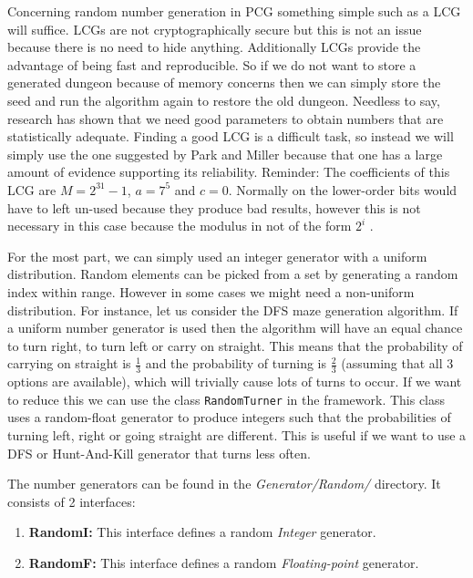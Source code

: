 Concerning random number generation in PCG something simple such as a LCG will suffice. LCGs are not cryptographically secure but this is not an issue because there is no need to hide anything. Additionally LCGs provide the advantage of being fast and reproducible. So if we do not want to store a generated dungeon because of memory concerns then we can simply store the seed and run the algorithm again to restore the old dungeon. Needless to say, research has shown that we need good parameters to obtain numbers that are statistically adequate. Finding a good LCG is a difficult task, so instead we will simply use the one suggested by Park and Miller because that one has a large amount of evidence supporting its reliability. Reminder: The coefficients of this LCG are $M = 2^{31}-1$, $a = 7^5$ and $c = 0$. Normally on the lower-order bits would have to left un-used because they produce bad results, however this is not necessary in this case because the modulus in not of the form $2^i$ \citep{park_miller}.

For the most part, we can simply used an integer generator with a uniform distribution. Random elements can be picked from a set by generating a random index within range. However in some cases we might need a non-uniform distribution. For instance, let us consider the DFS maze generation algorithm. If a uniform number generator is used then the algorithm will have an equal chance to turn right, to turn left or carry on straight. This means that the probability of carrying on straight is $\frac{1}{3}$ and the probability of turning is $\frac{2}{3}$ (assuming that all 3 options are available), which will trivially cause lots of turns to occur. If we want to reduce this we can use the class {\tt RandomTurner} in the framework. This class uses a random-float generator to produce integers such that the probabilities of turning left, right or going straight are different. This is useful if we want to use a DFS or Hunt-And-Kill generator that turns less often.

The number generators can be found in the {\em Generator/Random/} directory. It consists of 2 interfaces:

\begin{enumerate}
\item {\bf RandomI:} This interface defines a random {\em Integer} generator.
\item {\bf RandomF:} This interface defines a random {\em Floating-point} generator.
\end{enumerate}

